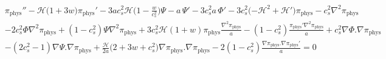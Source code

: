 \documentclass[a4paper,11pt]{article}
\begin{document}
\begin{align} 
 &\pi_{\text{phys}}'' - \mathcal{H} \Big (1+ 3w \Big)\pi_{\text{phys}}' -3 {a c_s^2 \mathcal{H}}\Big( 1- \frac{w}{c_s^2} \Big )\Psi -a \, {\Psi'}- 3 c_s^2 a \,{\Phi'} 
  -3  c_s^2 \Big({-\mathcal{H}^2 + \mathcal{H}'} \Big) \pi_{\text{phys}} 
 - c_s^2 {\nabla^2 \pi_{\text{phys}} }
             \nonumber
   \\
    &
     -2 c_s^2  \Phi  {\nabla^2 \pi_{\text{phys}} }  
  +   (1-c_s^2)  \Psi {\nabla^2 \pi_{\text{phys}} }
  +3 c_s^2 \mathcal{H} (1+w)\pi_{\text{phys}} \frac{\nabla^2 \pi_{\text{phys}} }{a}  
        -   (1-c_s^2) \frac{ \pi_{\text{phys}}' \nabla^2 {\pi_{\text{phys}} }}{a}   
             +c_s^2 {\nabla  \Phi . \nabla \pi_{\text{phys}} }
               \nonumber 
               \\
                &
        -(2 c_s^2-1) {\nabla  \Psi . \nabla \pi_{\text{phys}} }  
 +\frac{\mathcal{H}} {2 a} \Big(2+3w+c_s^2  \Big){\nabla  \pi_{\text{phys}} . \nabla \pi_{\text{phys}} } 
    -2   (1-c_s^2)\frac{\nabla  \pi_{\text{phys}} . \nabla {\pi_{\text{phys}}'} } {a}       =0
  \end{align} 
\end{document}
